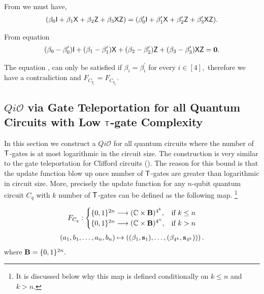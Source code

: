 From  we must have,
\begin{equation}
\label{lemma:1qubit:eq4}
\begin{aligned}
(\beta_0 {\sf I}+\beta_1 {\sf X}+\beta_2 {\sf Z}+\beta_3 {\sf X} {\sf Z}) =(\beta_0^\prime {\sf I}+\beta_1^\prime {\sf X}+\beta_2^\prime {\sf Z}+\beta_3^\prime {\sf X} {\sf Z}).\\
\end{aligned}
\end{equation}

From equation 
\begin{equation}
\label{lemma:1qubit:eq5}
\begin{aligned}
(\beta_0-\beta_0^\prime) {\sf I}+(\beta_1 -\beta_1^\prime){\sf X}+(\beta_2-\beta_2^\prime) {\sf Z}+(\beta_3-\beta^\prime_3) {\sf X} {\sf Z}={\bf 0}.
\end{aligned}
\end{equation}

The equation ,  can only be satisfied if $\beta_i = \beta_i^\prime$ for every $i\in[4],$ therefore we have a contradiction and $F_{C_{q_1}}=F_{C_{q_2}}.$



\subsection{$Qi\mathcal{O}$ via Gate Teleportation for all Quantum Circuits with Low ${\sf T}$-gate Complexity }
\label{sec:n-qubit-circuits}
In this section we construct a $Qi\mathcal{O}$ for all quantum circuits where the number of ${\sf T}$-gates is at most logarithmic in the circuit size. The construction is very similar to the gate teleportation for Clifford circuits (). The reason for this bound is that the update function blow up once number of ${\sf T}$-gates are greater than logarithmic in circuit size. More, precisely the update function for any $n$-qubit quantum circuit $C_q$ with $k$ number of ${\sf T}$-gates can be defined as the following map. \footnote{It is discussed below why this map is defined conditionally on $k\leq n$ and $k>n$.}

\begin{equation}
\label{nqubit:eq0}
\begin{aligned}
 F_{C_q}:
\begin{cases}
    \{0,1\}^{2n}\longrightarrow  (\mathbb{C} \times {\bf B})^{4^k},& \text{if } k\leq n\\
     \{0,1\}^{2n}\longrightarrow  (\mathbb{C} \times {\bf B})^{4^n}, & \text{if } k> n\\
\end{cases}
\end{aligned}
\end{equation}
\begin{equation}
\begin{aligned}
 (a_1,b_1,\ldots, a_n,b_n) \mapsto \left((\beta_1, {\bf s}_1),\dots, (\beta_{4^k}, {\bf s}_{4^k}))\right).
\end{aligned}
\end{equation}      
where  ${\bf B}=\{0,1\}^{2n}.$ 

